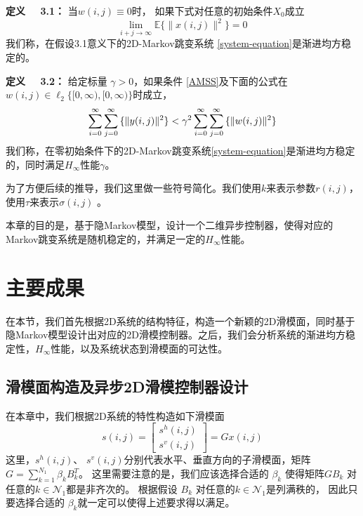 	{\bf 定义 \ \ 3.1：}
	当$w(i,j)\equiv0$时， 如果下式对任意的初始条件$X_{0}$成立
	\begin{equation}\label{AMSS}
	\lim\limits_{i+j\to\infty}\mathbb{E}\{\|x(i,j)\|^{2}\} = 0
	\end{equation}
	我们称，在假设3.1意义下的2D-Markov跳变系统 \eqref{system-equation}是渐进均方稳定的。
	
	{\bf 定义 \ \ 3.2：}
	给定标量 $\gamma>0$，如果条件 \eqref{AMSS}及下面的公式在$w(i,j)\in\ell_{2}\{[0,\infty),[0,\infty)\}$时成立，
	\begin{equation} \label{invDef2}
	\sum_{i=0}^{\infty}\sum_{j=0}^{\infty}\mathbb\{\|y(i,j)\|^{2}\} <  \gamma^{2} \sum_{i=0}^{\infty}\sum_{j=0}^{\infty}\mathbb\{\|w(i,j)\|^{2}\}
	\end{equation}
	我们称，在零初始条件下的2D-Markov跳变系统\eqref{system-equation}是渐进均方稳定的，同时满足$H_{\infty}$性能$\gamma$。

	为了方便后续的推导，我们这里做一些符号简化。我们使用$k$来表示参数$r(i,j)$，使用$\tau$来表示$\sigma(i,j)$ 。

	本章的目的是，基于隐Markov模型，设计一个二维异步控制器，使得对应的Markov跳变系统是随机稳定的，并满足一定的$H_{\infty}$性能。
	
\section{主要成果}
	在本节，我们首先根据2D系统的结构特征，构造一个新颖的2D滑模面，同时基于隐Markov模型设计出对应的2D滑模控制器。之后，我们会分析系统的渐进均方稳定性，$H_{\infty}$性能，以及系统状态到滑模面的可达性。

\subsection{滑模面构造及异步2D滑模控制器设计} \label{sliding-surface}
	在本章中，我们根据2D系统的特性构造如下滑模面
	\begin{equation}\label{siding-surface-equation}	
	s(i,j) = \begin{bmatrix}
	s^{h}(i,j)\\
	s^{v}(i,j)
	\end{bmatrix}
	= Gx(i,j)
	\end{equation}
	这里，$s^{h}(i,j)$、 $s^{v}(i,j)$分别代表水平、垂直方向的子滑模面，矩阵$G=\sum_{k=1}^{N_{1}}\beta_{k}B^{T}_{k}$。 这里需要注意的是，我们应该选择合适的 $\beta_{k}$ 使得矩阵$GB_{k}$ 对任意的$k\in\mathcal{N}_{1}$都是非齐次的。 根据假设 $B_{k}$ 对任意的$k\in\mathcal{N}_{1}$是列满秩的， 因此只要选择合适的 $\beta_{k}$就一定可以使得上述要求得以满足。 
	
